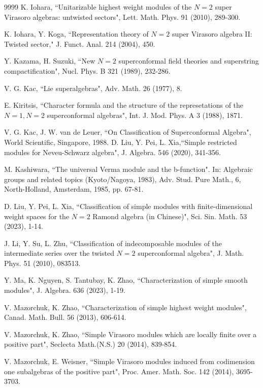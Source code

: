 \documentclass[12pt]{article}
\numberwithin{equation}{section}
\begin{document}
\begin{thebibliography}{9999}
 K. Iohara,  ``Unitarizable highest weight modules of the $N=2$ super Virasoro algebras: untwisted sectors",
Lett. Math. Phys. 91 (2010), 289-300.

 K. Iohara, Y. Koga,   ``Representation theory of $N=2$ super Virasoro algebra II: Twisted sector," J. Funct. Anal. 214  (2004),
450.

  Y. Kazama,  H. Suzuki,  ``New $N=2$ superconformal field theories and superstring compactification", Nucl.
Phys. B 321 (1989), 232-286.

 V. G. Kac,  ``Lie superalgebras", Adv. Math. 26 (1977), 8.

E. Kiritsis,  ``Character formula and the structure of the represetations of the $N=1,N=2$ superconformal algebras", Int.
J. Mod. Phys. A 3  (1988), 1871.

 V. G. Kac, J. W. van de Leuer,  ``On Classification of Superconformal Algebra", World Scientific, Singapore, 1988.
 D. Liu, Y. Pei, L. Xia,``Simple restricted modules for Neveu-Schwarz algebra",
J. Algebra. 546 (2020), 341-356.

 M. Kashiwara,  ``The universal Verma module and the b-function". In: Algebraic groups and
 related topics (Kyoto/Nagoya, 1983), Adv. Stud. Pure Math., 6, North-Holland, Amsterdam,
 1985, pp. 67-81.

 D. Liu, Y. Pei, L. Xia,  ``Classification of simple modules with finite-dimensional weight spaces for the $N=2$ Ramond algebra (in Chinese)", Sci. Sin. Math. 53 (2023), 1-14.

 J. Li, Y. Su, L. Zhu, ``Classification of indecomposable modules of the intermediate series over the twisted $N=2$
 superconformal algebra", J. Math. Phys. 51 (2010), 083513.

  Y. Ma, K. Nguyen, S. Tantubay, K. Zhao,  ``Characterization of simple smooth modules", J. Algebra. 636 (2023), 1-19.

 V. Mazorchuk, K. Zhao,  ``Characterization of simple highest weight modules",  Canad. Math. Bull. 56 (2013), 606-614.

 V. Mazorchuk, K. Zhao,  ``Simple Virasoro modules which are locally finite over a positive part",  Seclecta Math.(N.S.) 20 (2014), 839-854.

 V. Mazorchuk, E. Weisner, ``Simple Virasoro modules induced from codimension one subalgebras of the positive part",
Proc. Amer. Math. Soc. 142 (2014), 3695-3703.


\end{thebibliography}
\end{document}
